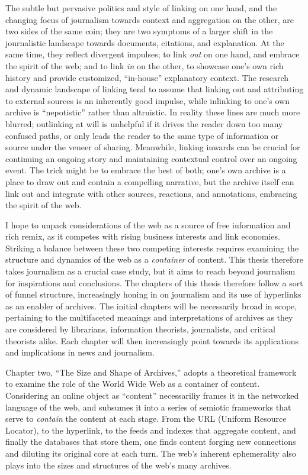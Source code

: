 The subtle but pervasive politics and style of linking on one hand, and the changing focus of journalism towards context and aggregation on the other, are two sides of the same coin; they are two symptoms of a larger shift in the journalistic landscape towards documents, citations, and explanation. At the same time, they reflect divergent impulses; to link \emph{out} on one hand, and embrace the spirit of the web; and to link \emph{in} on the other, to showcase one's own rich history and provide customized, ``in-house'' explanatory context. The research and dynamic landscape of linking tend to assume that linking out and attributing to external sources is an inherently good impulse, while inlinking to one's own archive is ``nepotistic'' rather than altruistic.\autocite[213]{chakrabarti_mining_2003} In reality these lines are much more blurred; outlinking at will is unhelpful if it drives the reader down too many confused paths, or only leads the reader to the same type of information or source under the veneer of sharing. Meanwhile, linking inwards can be crucial for continuing an ongoing story and maintaining contextual control over an ongoing event. The trick might be to embrace the best of both; one's own archive is a place to draw out and contain a compelling narrative, but the archive itself can link out and integrate with other sources, reactions, and annotations, embracing the spirit of the web.

I hope to unpack considerations of the web as a source of free information and rich remix, as it competes with rising business interests and link economies. Striking a balance between these two competing interests requires examining the structure and dynamics of the web as a \emph{container} of content. This thesis therefore takes journalism as a crucial case study, but it aims to reach beyond journalism for inspirations and conclusions. The chapters of this thesis therefore follow a sort of funnel structure, increasingly honing in on journalism and its use of hyperlinks as an enabler of archives. The initial chapters will be necessarily broad in scope, pertaining to the multifaceted meanings and interpretations of archives as they are considered by librarians, information theorists, journalists, and critical theorists alike. Each chapter will then increasingly point towards its applications and implications in news and journalism.

Chapter two, ``The Size and Shape of Archives,'' adopts a theoretical framework to examine the role of the World Wide Web as a container of content. Considering an online object as ``content'' necessariliy frames it in the networked language of the web, and subsumes it into a series of semiotic frameworks that serve to \emph{contain} the content at each stage. From the URL (Uniform Resource Locator), to the hyperlink, to the feeds and indexes that aggregate content, and finally the databases that store them, one finds content forging new connections and diluting its original core at each turn. The web's inherent ephemerality also plays into the sizes and structures of the web's many archives.

